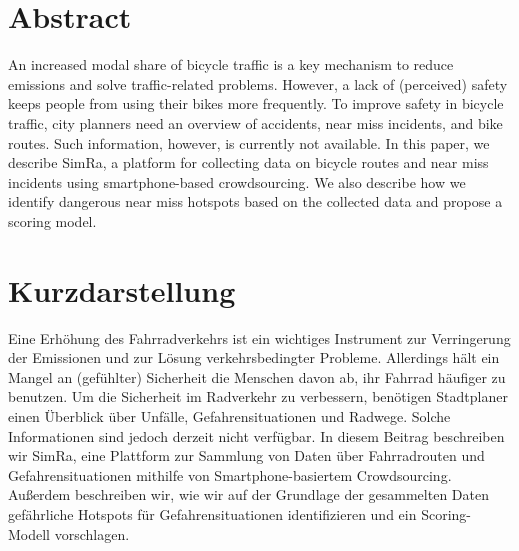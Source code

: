 
\cleardoublepage
{}
\section*{Abstract}

An increased modal share of bicycle traffic is a key mechanism to reduce emissions and solve traffic-related problems.
However, a lack of (perceived) safety keeps people from using their bikes more frequently.
To improve safety in bicycle traffic, city planners need an overview of accidents, near miss incidents, and bike routes.
Such information, however, is currently not available.
In this paper, we describe SimRa, a platform for collecting data on bicycle routes and near miss incidents using smartphone-based crowdsourcing.
We also describe how we identify dangerous near miss hotspots based on the collected data and propose a scoring model.



\newpage
{}
\section*{Kurzdarstellung}

Eine Erhöhung des Fahrradverkehrs ist ein wichtiges Instrument zur Verringerung der Emissionen und zur Lösung verkehrsbedingter Probleme. Allerdings hält ein Mangel an (gefühlter) Sicherheit die Menschen davon ab, ihr Fahrrad häufiger zu benutzen. Um die Sicherheit im Radverkehr zu verbessern, benötigen Stadtplaner einen Überblick über Unfälle, Gefahrensituationen und Radwege. Solche Informationen sind jedoch derzeit nicht verfügbar. In diesem Beitrag beschreiben wir SimRa, eine Plattform zur Sammlung von Daten über Fahrradrouten und Gefahrensituationen mithilfe von Smartphone-basiertem Crowdsourcing. Außerdem beschreiben wir, wie wir auf der Grundlage der gesammelten Daten gefährliche Hotspots für Gefahrensituationen identifizieren und ein Scoring-Modell vorschlagen.

